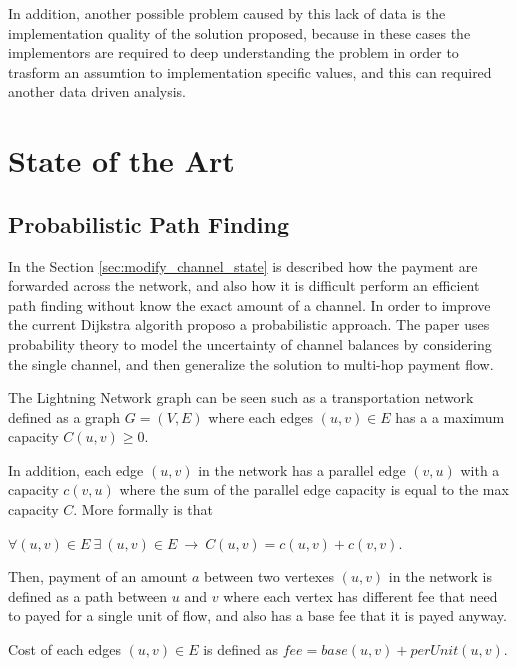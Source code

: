 In addition, another possible problem caused by this lack of data is the implementation
quality of the solution proposed, because in these cases 
the implementors are required to deep understanding the problem 
in order to trasform an assumtion to implementation specific values, 
and this can required another data driven analysis.

\section{State of the Art}

\subsection{Probabilistic Path Finding}

In the Section \ref{sec:modify_channel_state} is described how the payment are
forwarded across the network, and also how it is difficult perform an efficient 
path finding without know the exact amount of a channel. 
In order to improve the current Dijkstra algorith \cite{DBLP:journals/corr/abs-2103-08576}
proposo a probabilistic approach.
The paper \cite{DBLP:journals/corr/abs-2103-08576} uses probability theory to 
model the uncertainty of channel balances by considering the single channel, 
and then generalize the solution to multi-hop payment flow.

The Lightning Network graph can be seen such as a transportation network 
defined as a graph $G = (V, E)$ where each edges $(u, v) \in E$ has a 
a maximum capacity $C(u, v) \ge 0$.

In addition, each edge $(u, v)$ in the network has a parallel edge $(v, u)$ 
with a capacity $c(v, u)$ where the sum of the parallel edge capacity is
equal to the max capacity $C$. More formally is that 

\begin{center}
    $\forall (u, v) \in E \: \exists \: (u, v) \in E \: \rightarrow \: C(u, v) = c(u, v) + c(v, v)$.
\end{center}

Then, payment of an amount $a$ between two vertexes $(u, v)$ in the network is defined 
as a path between $u$ and $v$ where each vertex has different fee that need to payed for a 
single unit of flow, and also has a base fee that it is payed anyway.

\begin{definition}
    Cost of each edges $(u, v) \in E$ is defined as $fee = base(u, v) + perUnit(u, v)$.
\end{definition}

